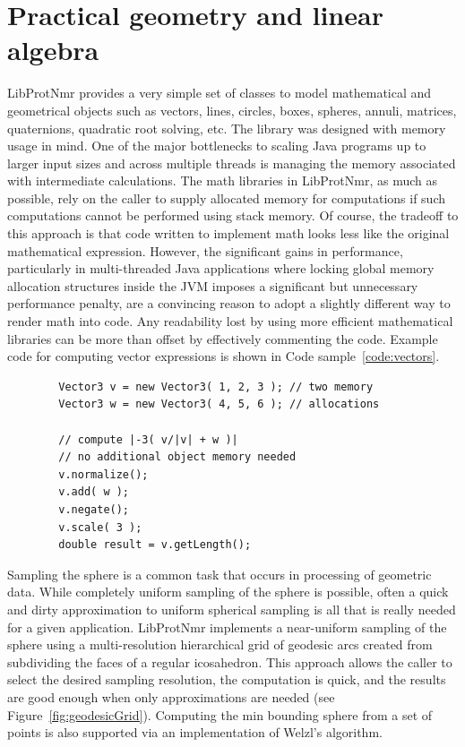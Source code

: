 \documentclass[11pt]{article}
\newcommand{\software}[1]{{\sc #1}}
\newcommand{\figref}[1]{Figure~\ref{#1}}
\newcommand{\coderef}[1]{Code sample~\ref{#1}}
\newenvironment{codesample}
{
\begin{codesamplefloat}
\centering
\RecustomVerbatimEnvironment{Verbatim}{BVerbatim}{}
\vspace{0.1in}
}{
\end{codesamplefloat}
}
\newcommand{\libprotnmr}{\software{LibProtNmr}}
\begin{document}
\section{Practical geometry and linear algebra}

{\libprotnmr} provides a very simple set of classes to model mathematical and geometrical objects such as vectors, lines, circles, boxes, spheres, annuli, matrices, quaternions, quadratic root solving, etc. The library was designed with memory usage in mind. One of the major bottlenecks to scaling Java programs up to larger input sizes and across multiple threads is managing the memory associated with intermediate calculations. The math libraries in {\libprotnmr}, as much as possible, rely on the caller to supply allocated memory for computations if such computations cannot be performed using stack memory. Of course, the tradeoff to this approach is that code written to implement math looks less like the original mathematical expression. However, the significant gains in performance, particularly in multi-threaded Java applications where locking global memory allocation structures inside the JVM imposes a significant but unnecessary performance penalty, are a convincing reason to adopt a slightly different way to render math into code. Any readability lost by using more efficient mathematical libraries can be more than offset by effectively commenting the code. Example code for computing vector expressions is shown in \coderef{code:vectors}.

\begin{codesample}
	\caption{
		Vector manipulation using {\libprotnmr}
	}
	\begin{verbatim}
		Vector3 v = new Vector3( 1, 2, 3 ); // two memory
		Vector3 w = new Vector3( 4, 5, 6 ); // allocations
		
		// compute |-3( v/|v| + w )|
		// no additional object memory needed
		v.normalize();
		v.add( w );
		v.negate();
		v.scale( 3 );
		double result = v.getLength();
	\end{verbatim}
	\label{code:vectors}
\end{codesample}

Sampling the sphere is a common task that occurs in processing of geometric data. While completely uniform sampling of the sphere is possible, often a quick and dirty approximation to uniform spherical sampling is all that is really needed for a given application. {\libprotnmr} implements a near-uniform sampling of the sphere using a multi-resolution hierarchical grid of geodesic arcs created from subdividing the faces of a regular icosahedron. This approach allows the caller to select the desired sampling resolution, the computation is quick, and the results are good enough when only approximations are needed (see \figref{fig:geodesicGrid}). Computing the min bounding sphere from a set of points is also supported via an implementation of Welzl's algorithm.
\end{document}

